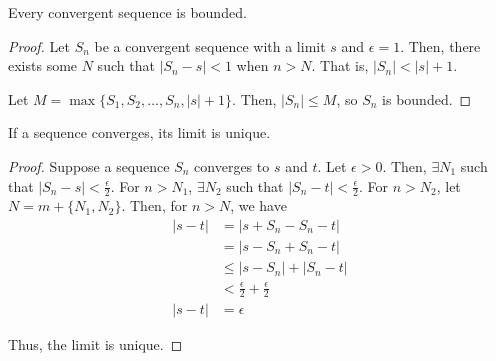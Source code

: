 \begin{theorem}
    Every convergent sequence is bounded.
\end{theorem}
\begin{proof}
    Let $S_n$ be a convergent sequence with a limit $s$ and $\epsilon = 1$. Then, there exists some $N$ such that $|S_n - s| < 1$ when $n > N$. That is, $|S_n| < |s| + 1$.

    Let $M = \max\{S_1, S_2, \ldots, S_n, |s| + 1\}$. Then, $|S_n| \leq M$, so $S_n$ is bounded.
\end{proof}

\begin{theorem}
    If a sequence converges, its limit is unique.
\end{theorem}
\begin{proof}
    Suppose a sequence $S_n$ converges to $s$ and $t$. Let $\epsilon > 0$. Then, $\exists N_1$ such that $|S_n - s| < \frac{\epsilon}{2}$. For $n > N_1$, $\exists N_2$ such that $|S_n - t| < \frac{\epsilon}{2}$. For $n > N_2$, let $N = m + \{N_1, N_2\}$. Then, for $n > N$, we have
    \begin{align*}
        |s - t| &= |s + S_n - S_n - t| \\
        &= |s - S_n + S_n - t| \\
        &\leq |s - S_n| + |S_n - t| \\
        &< \frac{\epsilon}{2} + \frac{\epsilon}{2} \\
        |s - t| &= \epsilon
    \end{align*}

    Thus, the limit is unique.
\end{proof}